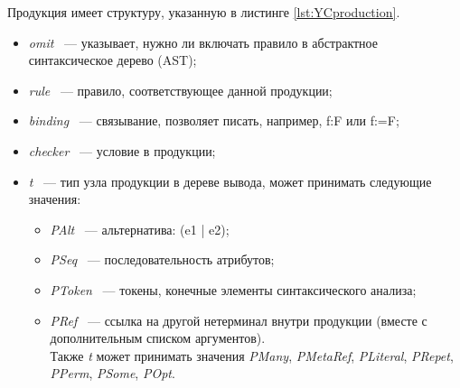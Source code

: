 \documentclass[14pt]{matmex-diploma}
\begin{document}
Продукция имеет структуру, указанную в листинге \ref{lst:YCproduction}.
\begin{itemize}
\item
\textit{omit} ~--- указывает, нужно ли включать правило в абстрактное синтаксическое дерево (AST);
\item
\textit{rule} ~--- правило, соответствующее данной продукции;
\item
\textit{binding} ~--- связывание, позволяет писать, например, f:F или f:=F;
\item
\textit{checker} ~--- условие в продукции;
\item
\textit{t} ~--- тип узла продукции в дереве вывода, может принимать следующие значения:
  \begin{itemize}
  \item
  \textit{PAlt} ~--- альтернатива: (e1 | e2);
  \item
  \textit{PSeq} ~--- последовательность атрибутов;
  \item
  \textit{PToken} ~--- токены, конечные элементы синтаксического анализа;
  \item
  \textit{PRef} ~--- ссылка на другой нетерминал внутри продукции (вместе с дополнительным списком аргументов).
  \\Также \textit{t} может принимать значения \textit{PMany}, \textit{PMetaRef}, \textit{PLiteral}, \textit{PRepet}, \textit{PPerm}, \textit{PSome}, \textit{POpt}.
  \end{itemize}
\end{itemize}

\end{document}
